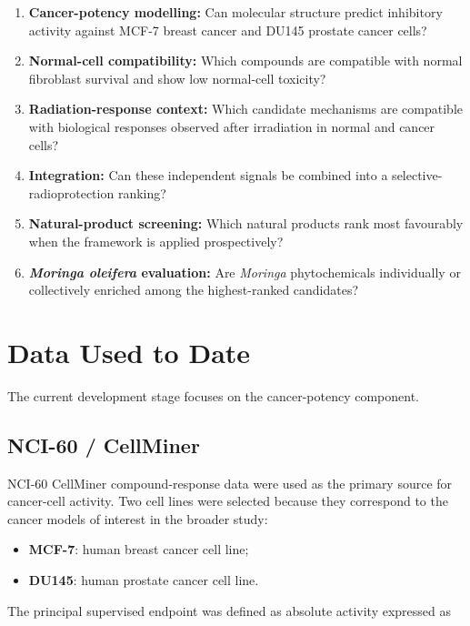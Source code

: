 \documentclass[11pt,a4paper]{article}
\begin{document}
\begin{enumerate}[leftmargin=1.6em]
    \item \textbf{Cancer-potency modelling:} Can molecular structure predict inhibitory activity against MCF-7 breast cancer and DU145 prostate cancer cells?
    \item \textbf{Normal-cell compatibility:} Which compounds are compatible with normal fibroblast survival and show low normal-cell toxicity?
    \item \textbf{Radiation-response context:} Which candidate mechanisms are compatible with biological responses observed after irradiation in normal and cancer cells?
    \item \textbf{Integration:} Can these independent signals be combined into a selective-radioprotection ranking?
    \item \textbf{Natural-product screening:} Which natural products rank most favourably when the framework is applied prospectively?
    \item \textbf{\textit{Moringa oleifera} evaluation:} Are \textit{Moringa} phytochemicals individually or collectively enriched among the highest-ranked candidates?
\end{enumerate}

\section{Data Used to Date}

The current development stage focuses on the cancer-potency component.

\subsection{NCI-60 / CellMiner}

NCI-60 CellMiner compound-response data were used as the primary source for cancer-cell activity. Two cell lines were selected because they correspond to the cancer models of interest in the broader study:

\begin{itemize}[leftmargin=1.6em]
    \item \textbf{MCF-7}: human breast cancer cell line;
    \item \textbf{DU145}: human prostate cancer cell line.
\end{itemize}

The principal supervised endpoint was defined as absolute activity expressed as
\end{document}

